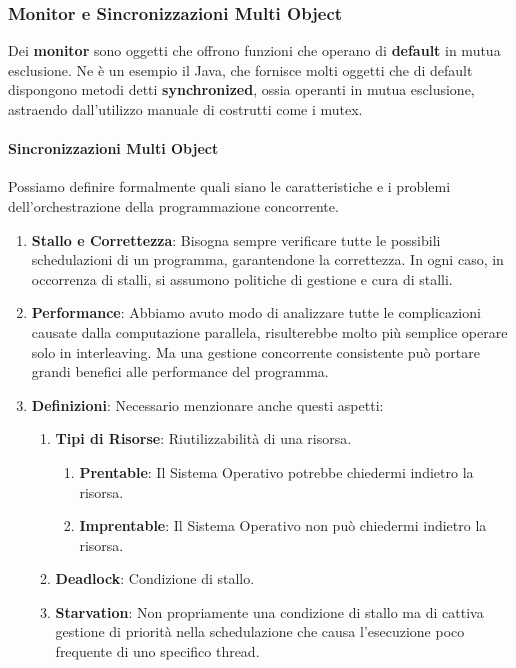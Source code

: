 \documentclass{article}
\begin{document}
\subsubsection{Monitor e Sincronizzazioni Multi Object}

Dei \textbf{monitor} sono oggetti che offrono funzioni che operano di \textbf{default} in mutua esclusione. Ne è un esempio il Java, che fornisce molti oggetti
che di default dispongono metodi detti \textbf{synchronized}, ossia operanti in mutua esclusione, astraendo dall'utilizzo manuale di costrutti come i mutex.

\paragraph{Sincronizzazioni Multi Object} Possiamo definire formalmente quali siano le caratteristiche e i problemi dell'orchestrazione della programmazione concorrente.

\begin{enumerate}
    \item \textbf{Stallo e Correttezza}: Bisogna sempre verificare tutte le possibili schedulazioni di un programma, garantendone la correttezza. In ogni caso, in occorrenza di stalli, si
    assumono politiche di gestione e cura di stalli.
    \item \textbf{Performance}: Abbiamo avuto modo di analizzare tutte le complicazioni causate dalla computazione parallela, risulterebbe molto più semplice operare solo in interleaving. Ma una gestione concorrente
    consistente può portare grandi benefici alle performance del programma.
\newpage
    \item \textbf{Definizioni}: Necessario menzionare anche questi aspetti:
    \begin{enumerate}
        \item \textbf{Tipi di Risorse}: Riutilizzabilità di una risorsa.
        \begin{enumerate}
            \item \textbf{Prentable}: Il Sistema Operativo potrebbe chiedermi indietro la risorsa.
            \item \textbf{Imprentable}: Il Sistema Operativo non può chiedermi indietro la risorsa.
        \end{enumerate}
        \item \textbf{Deadlock}: Condizione di stallo.
        \item \textbf{Starvation}: Non propriamente una condizione di stallo ma di cattiva gestione di priorità nella schedulazione che causa l'esecuzione
        poco frequente di uno specifico thread.
    \end{enumerate}
\end{enumerate}

\newpage
\end{document}
